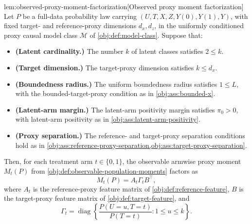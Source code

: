 \documentclass[11pt]{article}
\begin{document}
\begin{lemmav}{lem:observed-proxy-moment-factorization}[Observed proxy moment factorization]
Let \(P\) be a full-data probability law carrying \((U,T,X,Z,Y(0),Y(1),Y)\), with fixed target- and reference-proxy dimensions \(d_x,d_z\), in the uniformly conditioned proxy causal model class \(\mathcal M\) of \cref{obj:def:model-class}. Suppose that:
\begin{itemize}
\item \textbf{(Latent cardinality.)} The number \(k\) of latent classes satisfies \(2\le k\).
\item \textbf{(Target dimension.)} The target-proxy dimension satisfies \(k\le d_x\).
\item \textbf{(Boundedness radius.)} The uniform boundedness radius satisfies \(1\le L\), with the bounded-target-proxy condition as in \cref{obj:ass:bounded-x}.
\item \textbf{(Latent-arm margin.)} The latent-arm positivity margin satisfies \(\pi_0>0\), with latent-arm positivity as in \cref{obj:ass:latent-arm-positivity}.
\item \textbf{(Proxy separation.)} The reference- and target-proxy separation conditions hold as in \cref{obj:ass:reference-proxy-separation,obj:ass:target-proxy-separation}.
\end{itemize}
Then, for each treatment arm \(t\in\{0,1\}\), the observable armwise proxy moment \(M_t(P)\) from \cref{obj:def:observable-population-moments} factors as
\[
M_t(P)=A_t\Gamma_t B^\top,
\]
where \(A_t\) is the reference-proxy feature matrix of \cref{obj:def:reference-feature}, \(B\) is the target-proxy feature matrix of \cref{obj:def:target-feature}, and
\[
\Gamma_t
=
\operatorname{diag}\left\{
\frac{P(U=u,T=t)}{P(T=t)}:1\le u\le k
\right\}.
\]
\end{lemmav}
\end{document}
